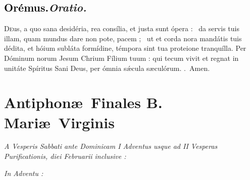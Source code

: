 \documentclass[12pt]{article} %
\newenvironment{rubric}{\vspace{1 mm}\color{benred8} \itshape \leftskip 0in \setlength{\parindent}{0.25in}}{\vspace{1 mm}}
\newenvironment{response}{\leftskip 0in \setlength{\parindent}{0in}}{\vspace{1 mm}}
\let\oldgresixstar\gresixstar
\renewcommand{\gresixstar}{\textcolor{benred8}{\oldgresixstar}}
\let\oldgredagger\gredagger
\renewcommand{\gredagger}{\textcolor{benred8}{\oldgredagger}}
\let\oldRbar\Rbar
\renewcommand{\Rbar}{\textcolor{benred8}{\oldRbar .}}
\def\capitulumSpace{\hspace{20 mm}}
\begin{document}
\subsection*{\textcolor{black}{Or\'{e}mus.}\capitulumSpace \emph{Oratio.}}

\begin{response}\lettrine{D}{e}us, a quo sana desid\'{e}ria, rea cons\'{i}lia, et justa sunt \'{o}pera : \gredagger\ da servis tuis illam, quam mundus dare non pote, pacem ; \gresixstar\ ut et corda nora mand\'{a}tis tuis d\'{e}dita, et h\'{o}ium subl\'{a}ta form\'{i}dine, t\'{e}mpora sint tua proteione tranqu\'{i}lla. Per D\'{o}minum norum Jesum Chrium F\'{i}lium tuum : qui tecum vivit et regnat in unit\'{a}te Sp\'{i}ritus Sani Deus, per \'{o}mnia s\'{\ae}cula s\ae cul\'{o}rum. \Rbar\ Amen.

\end{response}

\newpage


\section*{Antiphon\ae\ Finales B. Mari\ae\ Virginis}
\label{sec:AntBMV}

\thispagestyle{plain}


\begin{rubric}
\hspace*{25pt}A Vesperis Sabbati ante Dominicam I Adventus usque ad II Vesperas Purificationis, diei Februarii inclusive :

\end{rubric}


\gresetfirstlineaboveinitial{\small \textsc{ \textbf{\textcolor{benred8}{V}}}}{\small \textsc{ \textbf{\textcolor{benred8}{V}}}}

\vspace{2mm}

\begin{rubric}
In Adventu :

\end{rubric}
\end{document}
